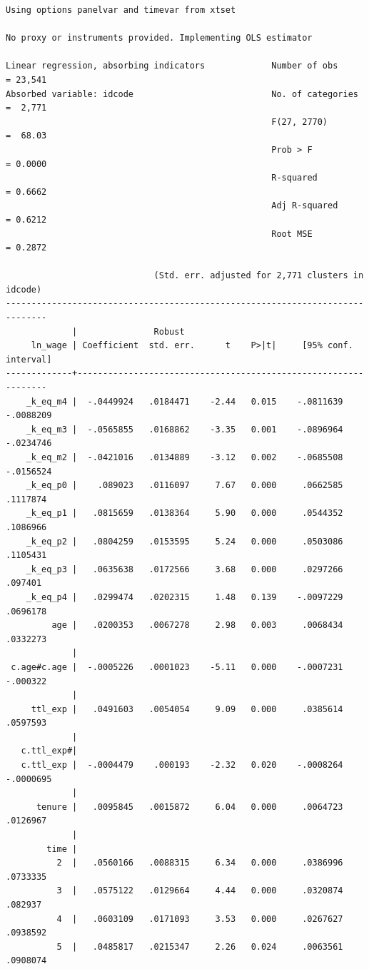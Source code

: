 \documentclass[
]{book}
\begin{document}
\begin{verbatim}
Using options panelvar and timevar from xtset

No proxy or instruments provided. Implementing OLS estimator

Linear regression, absorbing indicators             Number of obs     = 23,541
Absorbed variable: idcode                           No. of categories =  2,771
                                                    F(27, 2770)       =  68.03
                                                    Prob > F          = 0.0000
                                                    R-squared         = 0.6662
                                                    Adj R-squared     = 0.6212
                                                    Root MSE          = 0.2872

                             (Std. err. adjusted for 2,771 clusters in idcode)
------------------------------------------------------------------------------
             |               Robust
     ln_wage | Coefficient  std. err.      t    P>|t|     [95% conf. interval]
-------------+----------------------------------------------------------------
    _k_eq_m4 |  -.0449924   .0184471    -2.44   0.015    -.0811639   -.0088209
    _k_eq_m3 |  -.0565855   .0168862    -3.35   0.001    -.0896964   -.0234746
    _k_eq_m2 |  -.0421016   .0134889    -3.12   0.002    -.0685508   -.0156524
    _k_eq_p0 |    .089023   .0116097     7.67   0.000     .0662585    .1117874
    _k_eq_p1 |   .0815659   .0138364     5.90   0.000     .0544352    .1086966
    _k_eq_p2 |   .0804259   .0153595     5.24   0.000     .0503086    .1105431
    _k_eq_p3 |   .0635638   .0172566     3.68   0.000     .0297266     .097401
    _k_eq_p4 |   .0299474   .0202315     1.48   0.139    -.0097229    .0696178
         age |   .0200353   .0067278     2.98   0.003     .0068434    .0332273
             |
 c.age#c.age |  -.0005226   .0001023    -5.11   0.000    -.0007231    -.000322
             |
     ttl_exp |   .0491603   .0054054     9.09   0.000     .0385614    .0597593
             |
   c.ttl_exp#|
   c.ttl_exp |  -.0004479    .000193    -2.32   0.020    -.0008264   -.0000695
             |
      tenure |   .0095845   .0015872     6.04   0.000     .0064723    .0126967
             |
        time |
          2  |   .0560166   .0088315     6.34   0.000     .0386996    .0733335
          3  |   .0575122   .0129664     4.44   0.000     .0320874     .082937
          4  |   .0603109   .0171093     3.53   0.000     .0267627    .0938592
          5  |   .0485817   .0215347     2.26   0.024     .0063561    .0908074

\end{verbatim}
\end{document}
